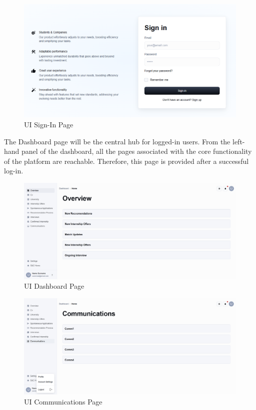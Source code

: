\begin{figure}[H]
    \centering
    \includegraphics[width=\textwidth]{Latex/Images/SignInPage.png}
    \caption{UI Sign-In Page}
    \label{fig:signinpage}
\end{figure}
The Dashboard page will be the central hub for logged-in users. From the left-hand panel of the dashboard, all the pages associated with the core functionality of the platform are reachable. Therefore, this page is provided after a successful log-in.
\begin{figure}[H]
    \centering
    \includegraphics[width=\textwidth]{Latex/Images/Dashboard.png}
    \caption{UI Dashboard Page}
    \label{fig:dashboardpage}
\end{figure}
\begin{figure}[H]
    \centering
    \includegraphics[width=\textwidth]{Latex/Images/Communication.png}
    \caption{UI Communications Page}
    \label{fig:comunicationspage}
\end{figure}
